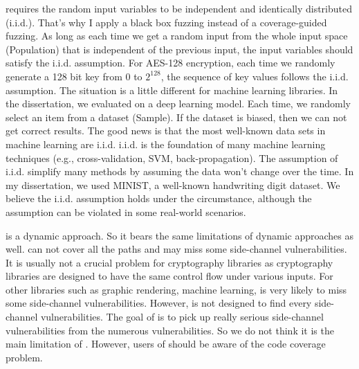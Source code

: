 \ctool{} requires the random input variables to be independent and identically distributed (i.i.d.). That's why I apply a black box fuzzing instead of a coverage-guided fuzzing. As long as each time we get a random input from the whole input space (Population) that is independent of the previous input, the input variables should satisfy the i.i.d. assumption. For AES-128 encryption, each time we randomly generate a 128 bit key from $0$ to $2^{128}$, the sequence of key values follows the i.i.d. assumption. The situation is a little different for machine learning libraries. In the dissertation, we evaluated \ctool{} on a deep learning model. Each time, we randomly select an item from a dataset (Sample). If the dataset is biased, then we can not get correct results. The good news is that the most well-known data sets in
machine learning are i.i.d. i.i.d. is the foundation of many machine learning
techniques (e.g., cross-validation, SVM, back-propagation). The assumption of i.i.d. 
simplify many methods by assuming the data won't change over the time. 
In my dissertation, we used MINIST, a well-known handwriting digit dataset. 
We believe the i.i.d. assumption holds under the circumstance, although the
assumption can be violated in some real-world scenarios.


\ctool{} is a dynamic approach. So it bears the same limitations of dynamic approaches as well. \ctool{} can not cover all the paths and may miss some side-channel vulnerabilities. It is usually not a crucial problem for cryptography libraries as cryptography libraries are designed to have the same control flow under various inputs. For other libraries such as graphic rendering, machine learning, \ctool{} is very likely to miss some side-channel vulnerabilities. However, \ctool{} is not designed to find every side-channel vulnerabilities. The goal of \ctool{} is to pick up really serious side-channel vulnerabilities from the numerous vulnerabilities. So we do not think it is the main limitation of \ctool{}. However, users of \ctool{} should be aware of the code coverage problem. 

